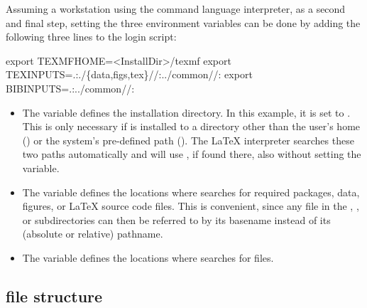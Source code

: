 Assuming a workstation using the  command language
interpreter, as a second and final step, setting the three environment
variables can be done by adding the following three lines to the
 login script:
%
\begin{CommandLineListing}[style=DefaultFileListing, print=true, gobble=3]
   export TEXMFHOME=<InstallDir>/texmf
   export TEXINPUTS=.:./\{data,figs,tex\}//:../common//:
   export BIBINPUTS=.:../common//:
\end{CommandLineListing}
%
\begin{itemize}
\item The  variable defines the \wegcLaTeX{}
  installation directory. In this example, it is set to
  . This is only necessary if
  \wegcLaTeX{} is installed to a directory other than the user's home
  () or the system's pre-defined path
  (). The \LaTeX{} interpreter searches these two
  paths automatically and will use \wegcLaTeX{}, if found there, also
  without setting the  variable.
\item The  variable defines the locations where
  \wegcLaTeX{} searches for required packages, data, figures, or \LaTeX{}
  source code files. This is convenient, since any file in the
  , ,  or 
  subdirectories can then be referred to by its basename instead of its
  (absolute or relative) pathname.
\item The  variable defines the locations where
  \wegcLaTeX{} searches for  files.
\end{itemize}
%


\subsection{\wegcLaTeX{} file structure}
\label{subsec:structure}

